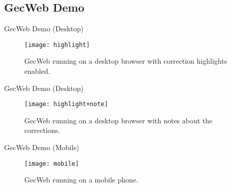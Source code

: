 \subsection{GecWeb Demo}

\begin{frame}{GecWeb Demo (Desktop)}
  \begin{figure}
    \texttt{[image: highlight]}
    \caption{GecWeb running on a desktop browser with correction highlights enabled.}
  \end{figure}
\end{frame}

\begin{frame}{GecWeb Demo (Desktop)}
  \begin{figure}
    \texttt{[image: highlight+note]}
    \caption{GecWeb running on a desktop browser with notes about the corrections.}
  \end{figure}
\end{frame}

\begin{frame}{GecWeb Demo (Mobile)}
  \begin{figure}
    \texttt{[image: mobile]}
    \caption{GecWeb running on a mobile phone.}
  \end{figure}
\end{frame}
